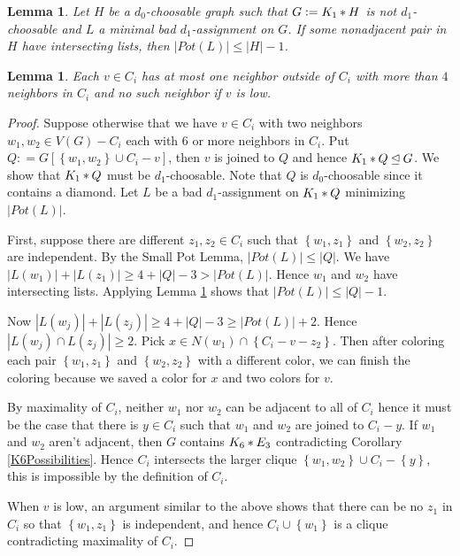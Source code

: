 \documentclass[12pt]{amsart}
\theoremstyle{plain}
\newtheorem{lem}[thm]{Lemma}
\theoremstyle{definition}
\theoremstyle{plain}
\newcommand{\set}[1]{\left\{ #1 \right\}}
\newcommand{\card}[1]{\left|#1\right|}
\newcommand{\join}[2]{#1 \mbox{\hspace{2 pt}$\ast$\hspace{2 pt}} #2}
\newcommand{\DefinedAs}{\mathrel{\mathop:}=}
\begin{document}
\begin{lem}\label{NeighborhoodPotShrink}
Let $H$ be a $d_0$-choosable graph such that $G \DefinedAs \join{K_1}{H}$ is not
$d_1$-choosable and $L$ a minimal bad $d_1$-assignment on $G$.  If some
nonadjacent pair in $H$ have intersecting lists, then $\card{Pot(L)} \leq \card{H} - 1$.
\end{lem}

\begin{lem}\label{AtMostFourIn}
Each $v \in C_i$ has at most one
neighbor outside of $C_i$ with more than $4$ neighbors in $C_i$ and no such
neighbor if $v$ is low.
\end{lem}
\begin{proof}
Suppose otherwise that we have $v \in C_i$ with two neighbors $w_1, w_2 \in V(G)
- C_i$ each with $6$ or more neighbors in $C_i$.  Put $Q \DefinedAs
G[\set{w_1,w_2} \cup C_i - v]$, then $v$ is joined to $Q$ and hence
$\join{K_1}{Q} \unlhd G$.  We show that $\join{K_1}{Q}$ must be $d_1$-choosable.  Note that $Q$ is $d_0$-choosable since it contains a diamond. Let $L$ be a bad $d_1$-assignment on $\join{K_1}{Q}$ minimizing $\card{Pot(L)}$.

First, suppose there are different $z_1,z_2 \in C_i$ such that $\set{w_1, z_1}$
and $\set{w_2, z_2}$ are independent.  By the Small Pot Lemma, $\card{Pot(L)} \leq \card{Q}$.  We have $\card{L(w_1)} + \card{L(z_1)} \geq 4 + \card{Q} - 3 > \card{Pot(L)}$.  Hence $w_1$ and $w_2$ have intersecting lists.  Applying Lemma \ref{NeighborhoodPotShrink} shows that $\card{Pot(L)} \leq \card{Q} - 1$.

Now $\card{L(w_j)} + \card{L(z_j)} \geq 4 + \card{Q} - 3 \geq \card{Pot(L)} + 2$.  Hence $\card{L(w_j) \cap L(z_j)} \geq 2$.  Pick $x \in N(w_1) \cap \set{C_i - v - z_2}$.  Then after coloring each pair $\set{w_1, z_1}$ and $\set{w_2, z_2}$ with a different color, we can finish the coloring because we saved a color for $x$ and two colors for $v$.

By maximality of $C_i$, neither $w_1$ nor $w_2$ can be adjacent to all of $C_i$
hence it must be the case that there is $y \in C_i$ such that $w_1$ and $w_2$
are joined to $C_i - y$.  If $w_1$ and $w_2$ aren't adjacent, then $G$ contains $\join{K_6}{E_3}$ contradicting Corollary \ref{K6Possibilities}.  Hence $C_i$ intersects the larger clique $\set{w_1, w_2} \cup C_i - \set{y}$, this is impossible by the definition of $C_i$.

When $v$ is low, an argument similar to the above shows that there can be no
$z_1$ in $C_i$ so that $\set{w_1, z_1}$ is independent, and hence $C_i \cup
\set{w_1}$ is a clique contradicting maximality of $C_i$.
\end{proof}



\end{document}

